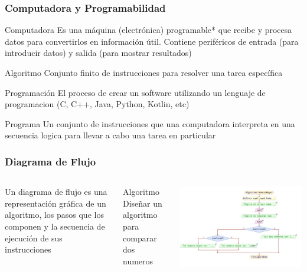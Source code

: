 

\begin{frame}
\frametitle{Computadora y Programabilidad}  
\begin{block}{Computadora}
Es una m\'aquina (electr\'onica) programable* que recibe y procesa datos para convertirlos en informaci\'on \'util. Contiene perif\'ericos de entrada (para introducir datos) y salida (para mostrar resultados) \pause
\end{block}
\begin{block}{Algoritmo}
Conjunto finito de instrucciones para resolver una tarea espec\'ifica \pause
\end{block}

\begin{block}{Programaci\'on}
El proceso de crear un software utilizando un lenguaje de programacion (C, C++, Java, Python, Kotlin, etc) \pause
\end{block}

\begin{block}{Programa}
Un conjunto de instrucciones que una computadora interpreta en una secuencia logica para llevar a cabo una tarea en particular \pause
\end{block}

\end{frame}

\begin{frame}
\frametitle{Diagrama de Flujo} 
\begin{columns}
Un diagrama de flujo es una representaci\'on gr\'afica de un algoritmo, los pasos que los componen y la secuencia de ejecuci\'on de sus instrucciones
\begin{block}{Algoritmo}
Dise\~nar un algoritmo para comparar dos numeros
\end{block}

\begin{center}
\includegraphics[width=0.95\linewidth]{00_IntroProgramacionYMoviles/DiagramaFlujo1.jpg} 
\end{center}
\end{columns}
\end{frame}

